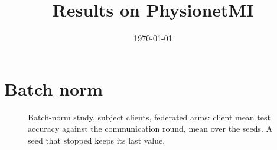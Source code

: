 \documentclass[a4paper]{article}
\title{Results on PhysionetMI}
\date{\today}
\begin{document}
\maketitle
\section{Batch norm}
\begin{table}[htbp]\centering
\caption{Batch-norm study: client mean test accuracy (\%), mean $\pm$ std over the seeds. Best mean of each row and network in bold.}
\resizebox{\ifdim\width>\linewidth\linewidth\else\width\fi}{!}{}
\end{table}
\begin{table}[htbp]\centering
\caption{Batch-norm study, SPDNet, subject clients: test accuracy of each subject (\%). Best mean of each row in bold.}
\resizebox{\ifdim\width>\linewidth\linewidth\else\width\fi}{!}{}
\end{table}
\begin{figure}[htbp]\centering

\caption{Batch-norm study, subject clients, federated arms: client mean test accuracy against the communication round, mean over the seeds. A seed that stopped keeps its last value.}
\end{figure}
\clearpage
\end{document}
